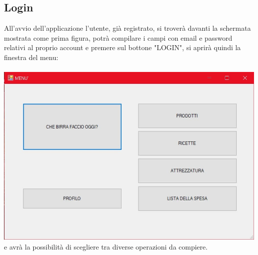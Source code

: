 \documentclass[a4paper, titlepage]{article}
\begin{document}
\subsection{Login}
All'avvio dell'applicazione l'utente, già registrato, si troverà davanti la schermata mostrata come prima figura, potrà compilare i campi con email e password relativi al proprio account e premere sul bottone "LOGIN", si aprirà quindi la finestra del menu:\\\\
\includegraphics[scale=0.30]{Immagini/form/Form Menu.jpg}
\\e avrà la possibilità di scegliere tra diverse operazioni da compiere.
\end{document}
